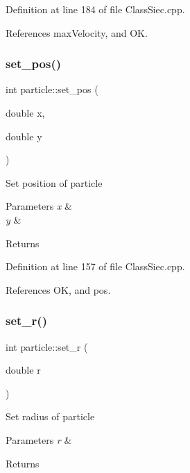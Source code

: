 Definition at line 184 of file Class\+Siec.\+cpp.



References max\+Velocity, and OK.

\mbox{\label{structparticle_a1088eb89ce4d29bc645160b91ba328c3}} 
\subsubsection{\texorpdfstring{set\+\_\+pos()}{set\_pos()}}
{\footnotesize\ttfamily int particle\+::set\+\_\+pos (\begin{DoxyParamCaption}\item[{double}]{x,  }\item[{double}]{y }\end{DoxyParamCaption})}

Set position of particle 
\begin{DoxyParams}{Parameters}
{\em x} & \\
\hline
{\em y} & \\
\hline
\end{DoxyParams}
\begin{DoxyReturn}{Returns}

\end{DoxyReturn}


Definition at line 157 of file Class\+Siec.\+cpp.



References OK, and pos.

\mbox{\label{structparticle_ad45d7067a63de0b6c6ce07723a8e7be2}} 
\subsubsection{\texorpdfstring{set\+\_\+r()}{set\_r()}}
{\footnotesize\ttfamily int particle\+::set\+\_\+r (\begin{DoxyParamCaption}\item[{double}]{r }\end{DoxyParamCaption})}

Set radius of particle 
\begin{DoxyParams}{Parameters}
{\em r} & \\
\hline
\end{DoxyParams}
\begin{DoxyReturn}{Returns}

\end{DoxyReturn}


